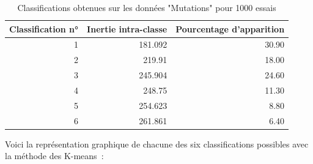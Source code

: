 \documentclass[a4paper,10pt]{report}
\begin{document}
\begin{table}[H]
	\centering
	\captionsetup{justification=centering, margin=3cm}
	\begin{tabular}{r|r|r}
		Classification n° & Inertie intra-classe & Pourcentage d'apparition \\
		\hline
		1 & 181.092 & 30.90 \\ 
		2 & 219.91 & 18.00 \\ 
		3 & 245.904 & 24.60 \\ 
		4 & 248.75 & 11.30 \\ 
		5 & 254.623 & 8.80 \\ 
		6 & 261.861 & 6.40 \\ 
	\end{tabular}
	\caption{Classifications obtenues sur les données "Mutations" pour 1000 essais}
\end{table}



Voici la représentation graphique de chacune des six classifications possibles avec la méthode des K-means~:
\end{document}
